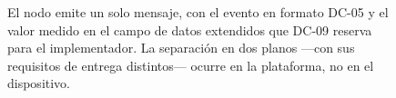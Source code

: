 \begin{figure}[htbp]
{}
\caption{El nodo emite un solo mensaje, con el evento en formato DC-05 y el valor medido en el campo de
datos extendidos que DC-09 reserva para el implementador. La separación en dos planos ---con sus
requisitos de entrega distintos--- ocurre en la plataforma, no en el dispositivo.}
\label{fig:dosplanos}
\end{figure}

